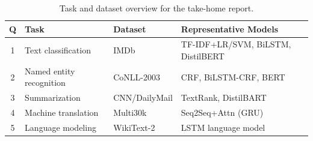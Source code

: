 \begin{table}[H]
\centering
\footnotesize
\begin{tabularx}{\linewidth}{c l l >{\raggedright\arraybackslash}X}
\toprule
Q & Task & Dataset & Representative Models \\
\midrule
1 & Text classification & IMDb & TF-IDF+LR/SVM, BiLSTM, DistilBERT \\
2 & Named entity recognition & CoNLL-2003 & CRF, BiLSTM-CRF, BERT \\
3 & Summarization & CNN/DailyMail & TextRank, DistilBART \\
4 & Machine translation & Multi30k & Seq2Seq+Attn (GRU) \\
5 & Language modeling & WikiText-2 & LSTM language model \\
\bottomrule
\end{tabularx}
\caption{Task and dataset overview for the take-home report.}
\label{tab:introduction_task_overview}
\end{table}